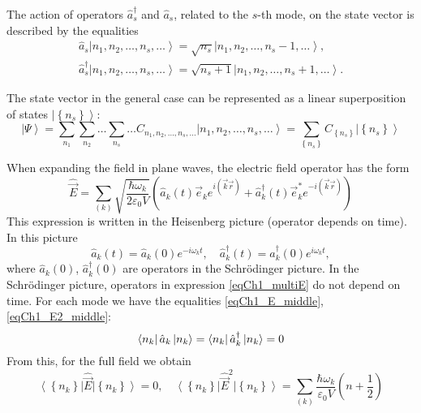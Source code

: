 The action of operators $\hat{a}_s^{\dag}$ and $\hat{a}_s$, related to the $s$-th
mode, on the state vector is described by the equalities
\begin{eqnarray}
\hat{a}_s \left| n_1, n_2, \dots, n_s, \dots\right> = \sqrt{n_s} \left|
n_1, n_2, \dots, n_s - 1, \dots\right>,
\nonumber \\
\hat{a}_s^{\dag} \left| n_1, n_2, \dots, n_s, \dots\right> = \sqrt{n_s + 1} \left|
n_1, n_2, \dots, n_s + 1, \dots\right>.
\end{eqnarray} 

The state vector in the general case can be represented as a linear
superposition of states  $\left| \left\{n_s\right\}\right>$:
\begin{equation}
\left|\Psi\right> = \sum_{n_1}\sum_{n_2}\dots\sum_{n_s}\dots
C_{n_1, n_2, \dots, n_s, \dots} \left| n_1, n_2, \dots, n_s,
\dots\right>= 
\sum_{\left\{n_s\right\}} C_{\left\{n_s\right\}} \left| \left\{n_s\right\}\right>
\end{equation}

When expanding the field in plane waves, the electric field operator has the form
\begin{equation}
\hat{\vec{E}} = \sum_{(k)} \sqrt{\frac{\hbar \omega_k}{2 \varepsilon_0
V}} \left( 
\hat{a}_k\left(t\right) \vec{e}_k e^{i \left(\vec{k}\vec{r} \right)} +
\hat{a}_k^{\dag}\left(t\right) \vec{e}_k^{*} e^{-i \left(\vec{k}\vec{r} \right)}
\right)
\label{eqCh1_multiE}
\end{equation}
This expression is written in the Heisenberg picture (operator depends
on time). In this picture
\[
\hat{a}_k\left(t\right) = \hat{a}_k\left(0\right) e^{-i \omega_k t},
\quad
\hat{a}_k^{\dag}\left(t\right) = \hat{a}_k^{\dag}\left(0\right) e^{i \omega_k t},
\]
where $\hat{a}_k\left(0\right)$, $\hat{a}_k^{\dag}\left(0\right)$ are
operators in the Schrödinger picture. In the Schrödinger picture,
operators in expression \eqref{eqCh1_multiE} do not depend on time.
For each mode we have the equalities \eqref{eqCh1_E_middle}, \eqref{eqCh1_E2_middle}:
\[
\bra{n_k}\hat{a}_k\ket{n_k} = 
\bra{n_k}\hat{a}^{\dag}_k\ket{n_k} = 0
\]
From this, for the full field we obtain
\begin{equation}
\left<\left\{n_k\right\}\right|\hat{\vec{E}}\left|\left\{n_k\right\}\right>
= 0, \quad
\left<\left\{n_k\right\}\right|\hat{\vec{E}}^2\left|\left\{n_k\right\}\right>
= \sum_{(k)}\frac{\hbar \omega_k}{\varepsilon_0 V}
\left(n + \frac{1}{2} \right)
\end{equation}

